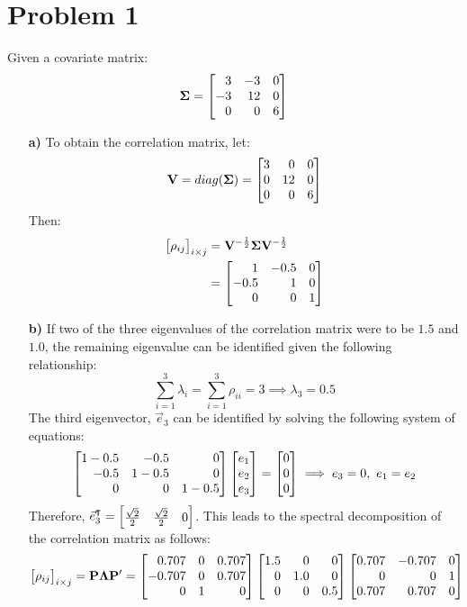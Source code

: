 


\maketitle

\section*{Problem 1}
Given a covariate matrix: $$\mathbf{\Sigma} = \m{3&-3&0\\-3&12&0\\0&0&6}$$
\begin{enumerate}
\item[\bf{a)}]
	To obtain the correlation matrix, let: $$\mf{V}=diag(\mathbf{\Sigma})=\m{3&0&0\\0&12&0\\0&0&6}$$ Then:
	\begin{align*}
		\m{\rho_{ij}}_{i \times j} &= \mf{V}^{-\frac{1}{2}} \mathbf{\Sigma} \mf{V}^{-\frac{1}{2}} \\
									&= \m{1&-0.5&0\\-0.5&1&0\\0&0&1}
	\end{align*}

\item[\bf{b)}]
	If two of the three eigenvalues of the correlation matrix were to be $1.5$ and $1.0$, the remaining eigenvalue can be identified given the following relationship: $$\sum_{i=1}^3\lambda_i=\sum_{i=1}^3\rho_{ii}=3 \implies \lambda_3 = 0.5$$ The third eigenvector, $\vec{e}_3$ can be identified by solving the following system of equations: $$\m{1-0.5&-0.5&0\\-0.5&1-0.5&0\\0&0&1-0.5} \m{e_1\\e_2\\e_3} = \m{0\\0\\0} \implies e_3 = 0,\ e_1 = e_2$$ Therefore, $\vec{e}_3^{\intercal}= \m{\frac{\sqrt{2}}{2}&\frac{\sqrt{2}}{2}&0}$. This leads to the spectral decomposition of the correlation matrix as follows: $$\m{\rho_{ij}}_{i \times j} = \mf{P} \mathbf{\Lambda} \mf{P}' = \m{0.707&0&0.707\\-0.707&0&0.707\\0&1&0} \m{1.5&0&0\\0&1.0&0\\0&0&0.5} \m{0.707&-0.707&0\\0&0&1\\0.707&0.707&0}$$


\end{enumerate}
